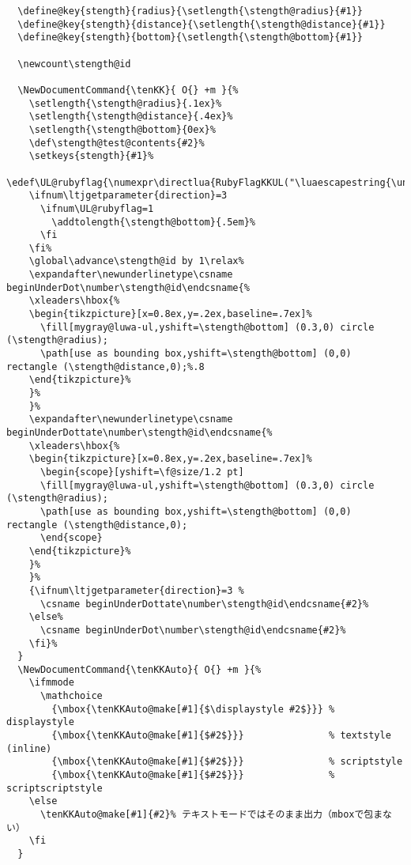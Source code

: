 \documentclass[luatex,fontsize=8pt,paper=b5,twoside]{jlreq}%
\begin{document}
\begin{lstlisting}
  \define@key{stength}{radius}{\setlength{\stength@radius}{#1}}
  \define@key{stength}{distance}{\setlength{\stength@distance}{#1}}
  \define@key{stength}{bottom}{\setlength{\stength@bottom}{#1}}

  \newcount\stength@id  

  \NewDocumentCommand{\tenKK}{ O{} +m }{%
    \setlength{\stength@radius}{.1ex}%
    \setlength{\stength@distance}{.4ex}%
    \setlength{\stength@bottom}{0ex}%
    \def\stength@test@contents{#2}%
    \setkeys{stength}{#1}%
    \edef\UL@rubyflag{\numexpr\directlua{RubyFlagKKUL("\luaescapestring{\unexpanded\expandafter{\stength@test@contents}}")}\relax}%
    \ifnum\ltjgetparameter{direction}=3
      \ifnum\UL@rubyflag=1
        \addtolength{\stength@bottom}{.5em}%
      \fi
    \fi%
    \global\advance\stength@id by 1\relax%
    \expandafter\newunderlinetype\csname beginUnderDot\number\stength@id\endcsname{%
    \xleaders\hbox{%
    \begin{tikzpicture}[x=0.8ex,y=.2ex,baseline=.7ex]%
      \fill[mygray@luwa-ul,yshift=\stength@bottom] (0.3,0) circle (\stength@radius);
      \path[use as bounding box,yshift=\stength@bottom] (0,0) rectangle (\stength@distance,0);%.8
    \end{tikzpicture}%
    }%
    }%
    \expandafter\newunderlinetype\csname beginUnderDottate\number\stength@id\endcsname{%
    \xleaders\hbox{%
    \begin{tikzpicture}[x=0.8ex,y=.2ex,baseline=.7ex]%
      \begin{scope}[yshift=\f@size/1.2 pt]
      \fill[mygray@luwa-ul,yshift=\stength@bottom] (0.3,0) circle (\stength@radius);
      \path[use as bounding box,yshift=\stength@bottom] (0,0) rectangle (\stength@distance,0);
      \end{scope}
    \end{tikzpicture}%
    }%
    }%
    {\ifnum\ltjgetparameter{direction}=3 %
      \csname beginUnderDottate\number\stength@id\endcsname{#2}%
    \else%
      \csname beginUnderDot\number\stength@id\endcsname{#2}%
    \fi}%
  }
  \NewDocumentCommand{\tenKKAuto}{ O{} +m }{%
    \ifmmode
      \mathchoice
        {\mbox{\tenKKAuto@make[#1]{$\displaystyle #2$}}} % displaystyle
        {\mbox{\tenKKAuto@make[#1]{$#2$}}}               % textstyle (inline)
        {\mbox{\tenKKAuto@make[#1]{$#2$}}}               % scriptstyle
        {\mbox{\tenKKAuto@make[#1]{$#2$}}}               % scriptscriptstyle
    \else
      \tenKKAuto@make[#1]{#2}% テキストモードではそのまま出力（mboxで包まない）
    \fi
  }


\end{lstlisting}
\end{document}
